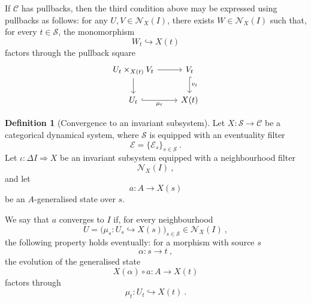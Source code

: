 \documentclass[a4paper,reqno,oneside]{amsart}
\theoremstyle{definition}
\newtheorem{definition}[theorem]{Definition}
\theoremstyle{remark}
\numberwithin{equation}{section}
\begin{document}
	
	If $\mathcal C$ has pullbacks, then the third condition above may be expressed
	using pullbacks as follows: for any $ U,V\in\mathcal N_X(I)$, there exists $W\in\mathcal N_X(I)$ such that, for every $t\in\mathcal S$, the monomorphism
	\begin{equation}
		W_t\hookrightarrow X(t)
	\end{equation}
	factors through the pullback square
	\begin{equation}
		\begin{tikzcd}
			U_t\times_{X(t)}V_t
			\arrow[r]
			\arrow[d]
			& V_t \arrow[d,hook,"v_t"] \\
			U_t \arrow[r,hook,"\mu_t"']
			& X(t)
		\end{tikzcd}
	\end{equation}
	
	
	
	
	\begin{definition}[Convergence to an invariant subsystem]\label{def: convergence}
		Let $X\colon\mathcal S\to\mathcal C$ be a categorical dynamical system, where $\mathcal S$ is equipped with an
		eventuality filter
		\begin{equation}
			\mathcal E=\{\mathcal E_s\}_{s\in\mathcal S} \ .
		\end{equation}
		Let $\iota\colon \Delta I\Longrightarrow X$ be an invariant subsystem equipped with a neighbourhood filter
		\begin{equation}
			\mathcal N_X(I) \ ,
		\end{equation}
		and let
		\begin{equation}
			a\colon A\to X(s)
		\end{equation}
		be an $A$-generalised state over $s$.
		
		We say that $a$ converges to $I$ if, for every neighbourhood
		\begin{equation}
			U=\bigl(\mu_s\colon U_s\hookrightarrow X(s)\bigr)_{s\in\mathcal S}
			\in \mathcal N_X(I) \ ,
		\end{equation}
		the following property holds eventually: for a
		morphism with source $s$
		\begin{equation}
			\alpha\colon s\to t \ ,
		\end{equation}
		the evolution of the generalised state
		\begin{equation}
			X(\alpha)\circ a\colon A\to X(t)
		\end{equation}
		factors through
		\begin{equation}
			\mu_t\colon U_t\hookrightarrow X(t) \ .
		\end{equation}
	\end{definition}
	
\end{document}
